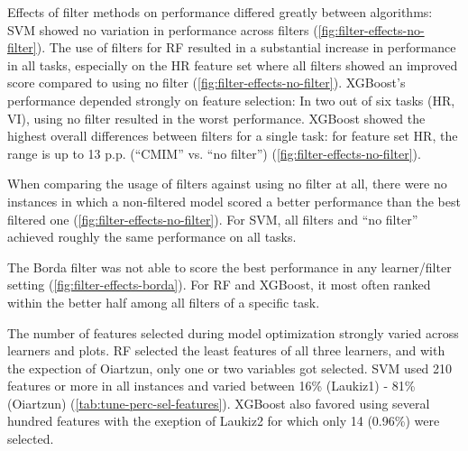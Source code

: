\documentclass[remotesensing,article,submit,moreauthors,pdftex]{Definitions/mdpi}
\begin{document}
Effects of filter methods on performance differed greatly between algorithms:
SVM showed no variation in performance across filters (\autoref{fig:filter-effects-no-filter}).
The use of filters for RF resulted in a substantial increase in performance in all tasks, especially on the HR feature set where all filters showed an improved score compared to using no filter (\autoref{fig:filter-effects-no-filter}).
XGBoost's performance depended strongly on feature selection: In two out of six tasks (HR, VI), using no filter resulted in the worst performance.
XGBoost showed the highest overall differences between filters for a single task: for feature set HR, the range is up to 13 p.p. (\enquote{CMIM} vs. \enquote{no filter}) (\autoref{fig:filter-effects-no-filter}).

When comparing the usage of filters against using no filter at all, there were no instances in which a non-filtered model scored a better performance than the best filtered one (\autoref{fig:filter-effects-no-filter}).
For SVM, all filters and \enquote{no filter} achieved roughly the same performance on all tasks.

The Borda filter was not able to score the best performance in any learner/filter setting (\autoref{fig:filter-effects-borda}).
For RF and XGBoost, it most often ranked within the better half among all filters of a specific task.

The number of features selected during model optimization strongly varied across learners and plots.
RF selected the least features of all three learners, and with the expection of Oiartzun, only one or two variables got selected.
SVM used 210 features or more in all instances and varied between 16\% (Laukiz1) - 81\% (Oiartzun) (\autoref{tab:tune-perc-sel-features}).
XGBoost also favored using several hundred features with the exeption of Laukiz2 for which only 14 (0.96\%) were selected.




\end{document}
